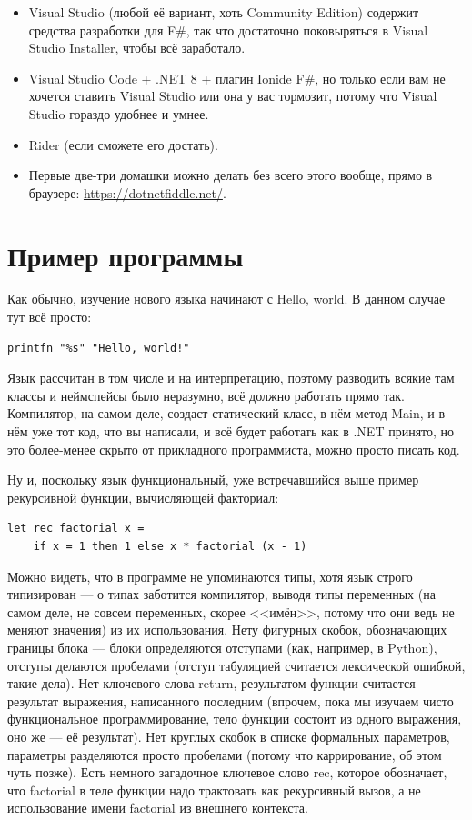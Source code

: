 \documentclass{../../text-style}
\begin{document}
\begin{itemize}
    \item Visual Studio (любой её вариант, хоть Community Edition) содержит средства разработки для F\#, так что достаточно поковыряться в Visual Studio Installer, чтобы всё заработало. 
    \item Visual Studio Code + .NET 8 + плагин Ionide F\#, но только если вам не хочется ставить Visual Studio или она у вас тормозит, потому что Visual Studio гораздо удобнее и умнее.
    \item Rider (если сможете его достать).
    \item Первые две-три домашки можно делать без всего этого вообще, прямо в браузере: \url{https://dotnetfiddle.net/}.
\end{itemize}

\section{Пример программы}

Как обычно, изучение нового языка начинают с Hello, world. В данном случае тут всё просто:

\begin{verbatim}
printfn "%s" "Hello, world!"
\end{verbatim}

Язык рассчитан в том числе и на интерпретацию, поэтому разводить всякие там классы и неймспейсы было неразумно, всё должно работать прямо так. Компилятор, на самом деле, создаст статический класс, в нём метод Main, и в нём уже тот код, что вы написали, и всё будет работать как в .NET принято, но это более-менее скрыто от прикладного программиста, можно просто писать код.

Ну и, поскольку язык функциональный, уже встречавшийся выше пример рекурсивной функции, вычисляющей факториал:

\begin{verbatim}
let rec factorial x =
    if x = 1 then 1 else x * factorial (x - 1)
\end{verbatim}

Можно видеть, что в программе не упоминаются типы, хотя язык строго типизирован --- о типах заботится компилятор, выводя типы переменных (на самом деле, не совсем переменных, скорее <<имён>>, потому что они ведь не меняют значения) из их использования. Нету фигурных скобок, обозначающих границы блока --- блоки определяются отступами (как, например, в Python), отступы делаются пробелами (отступ табуляцией считается лексической ошибкой, такие дела). Нет ключевого слова return, результатом функции считается результат выражения, написанного последним (впрочем, пока мы изучаем чисто функциональное программирование, тело функции состоит из одного выражения, оно же --- её результат). Нет круглых скобок в списке формальных параметров, параметры разделяются просто пробелами (потому что каррирование, об этом чуть позже). Есть немного загадочное ключевое слово rec, которое обозначает, что factorial в теле функции надо трактовать как рекурсивный вызов, а не использование имени factorial из внешнего контекста.
\end{document}
